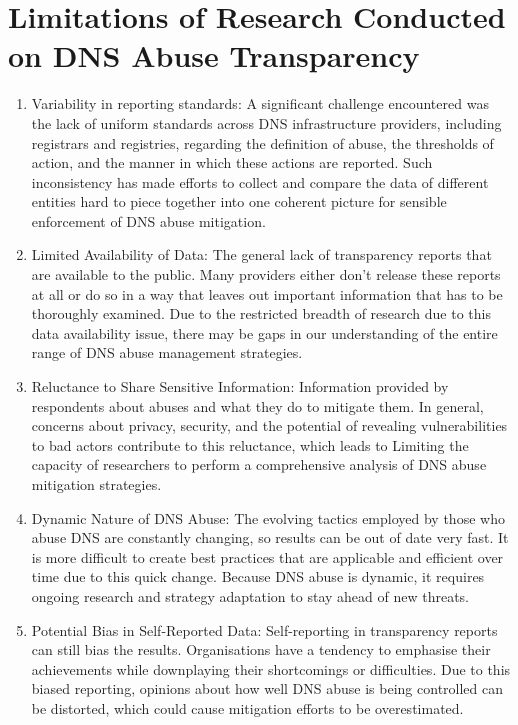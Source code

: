 \section{Limitations of Research Conducted on DNS Abuse Transparency }

\begin{enumerate}
    \item Variability in reporting standards: A significant challenge encountered was the lack of uniform standards across DNS infrastructure providers, including registrars and registries, regarding the definition of abuse, the thresholds of action, and the manner in which these actions are reported. Such inconsistency has made efforts to collect and compare the data of different entities hard to piece together into one coherent picture for sensible enforcement of DNS abuse mitigation.

    \item Limited Availability of Data: The general lack of transparency reports that are available to the public. Many providers either don't release these reports at all or do so in a way that leaves out important information that has to be thoroughly examined. Due to the restricted breadth of research due to this data availability issue, there may be gaps in our understanding of the entire range of DNS abuse management strategies.
    
    \item Reluctance to Share Sensitive Information: Information provided by respondents about abuses and what they do to mitigate them. In general, concerns about privacy, security, and the potential of revealing vulnerabilities to bad actors contribute to this reluctance, which leads to Limiting the capacity of researchers to perform a comprehensive analysis of DNS abuse mitigation strategies.
    
    \item Dynamic Nature of DNS Abuse: The evolving tactics employed by those who abuse DNS are constantly changing, so results can be out of date very fast. It is more difficult to create best practices that are applicable and efficient over time due to this quick change. Because DNS abuse is dynamic, it requires ongoing research and strategy adaptation to stay ahead of new threats.

    \item Potential Bias in Self-Reported Data: Self-reporting in transparency reports can still bias the results. Organisations have a tendency to emphasise their achievements while downplaying their shortcomings or difficulties. Due to this biased reporting, opinions about how well DNS abuse is being controlled can be distorted, which could cause mitigation efforts to be overestimated.
    

\end{enumerate}
